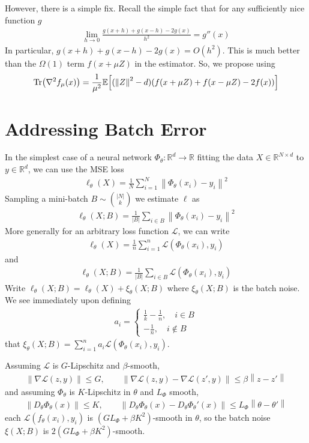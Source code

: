 \documentclass[twoside,11pt]{article}
\def\mbb#1{\mathbb{#1}}
\def \R{\mbb{R}}
\newcommand{\mg}[1]{\left \| #1 \right\|}
\newcommand{\E}{\mathbb{E}\qty}
\renewcommand{\grad}{\nabla}
\newcommand{\1}{\mathbbm{1}}
\begin{document}
However, there is a simple fix. Recall the simple fact that for any sufficiently nice function $g$
\begin{align*}
    \lim_{h \to 0} \frac{g(x+h) + g(x-h) - 2g(x)}{h^2} = g''(x)
\end{align*}
In particular, $g(x+h) + g(x-h) - 2g(x) = O(h^2)$. This is much better than the $\Omega(1)$ term $f(x+\mu Z)$ in the estimator. So, we propose using
\begin{align*}
    \Tr(\grad^2 f_\mu(x)) = \frac{1}{\mu^2} \E[(\mg{Z}^2 - d)(f(x + \mu Z) + f(x-\mu Z) - 2f(x))]
\end{align*}
\section{Addressing Batch Error}
In the simplest case of a neural network $\Phi_\theta: \R^d \to \R$ fitting the data $X \in \R^{N \times d}$ to $y \in \R^d$, we can use the MSE loss
\begin{align*}
    \ell_\theta(X) = \frac{1}{N} \sum_{i=1}^N \mg{\Phi_\theta(x_i) - y_i}^2
\end{align*}
Sampling a mini-batch $B \sim \binom{|N|}{k}$ we estimate $\ell$ as
\begin{align*}
    \ell_\theta(X ; B)=\frac{1}{|B|} \sum_{i \in B} \mg{\Phi_\theta(x_i) - y_i}^2
\end{align*}
More generally for an arbitrary loss function $\mathcal L$, we can write
\begin{align*}
    \ell_\theta(X) = \frac{1}{n} \sum_{i=1}^n \mathcal L(\Phi_\theta(x_i), y_i)
\end{align*}
and
\begin{align*}
    \ell_\theta(X;B) = \frac{1}{|B|} \sum_{i \in B} \mathcal L(\Phi_\theta(x_i), y_i)
\end{align*}
Write $\ell_\theta(X ; B) = \ell_\theta(X) + \xi_\theta(X ; B)$ where $\xi_\theta(X ; B)$ is the batch noise. We see immediately upon defining
\begin{align*}
    a_i = \begin{cases}
        \frac 1k - \frac 1n, \quad i \in B \\
        -\frac 1n, \quad i \not \in B
    \end{cases}
\end{align*}
that $\xi_\theta(X ; B) = \sum_{i=1}^n a_i \mathcal L(\Phi_\theta(x_i), y_i)$. 

Assuming $\mathcal L$ is $G$-Lipschitz and $\beta$-smooth,
\begin{align*}
    \mg{\grad \mathcal L(z, y)} \leq G, \qquad \mg{\grad \mathcal L(z,y) - \grad \mathcal L(z', y)} \leq \beta \mg{z-z'}
\end{align*} 
and assuming $\Phi_\theta$ is $K$-Lipschitz in $\theta$ and $L_\Phi$ smooth, 
\begin{align*}
    \mg{D_\theta \Phi_\theta(x)} \leq K, \qquad \mg{D_\theta \Phi_\theta(x) - D_\theta \Phi_\theta'(x)} \leq L_\Phi \mg{\theta - \theta'}
\end{align*}
each $\mathcal L(f_\theta(x_i), y_i)$ is $(GL_\Phi + \beta K^2)$-smooth in $\theta$, so the batch noise $\xi(X;B)$ is $2(GL_\Phi + \beta K^2)$-smooth. 
\end{document}
